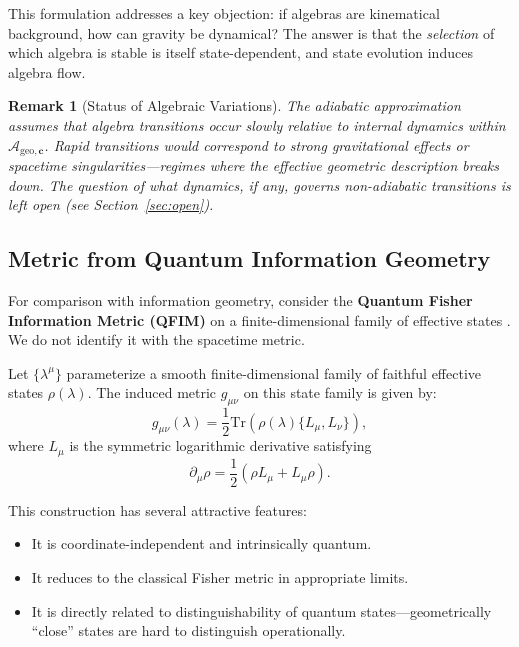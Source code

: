 \documentclass[12pt,a4paper]{article}
\newtheorem{remark}[theorem]{Remark}
\begin{document}
This formulation addresses a key objection: if algebras are kinematical background, how can gravity be dynamical? The answer is that the \emph{selection} of which algebra is stable is itself state-dependent, and state evolution induces algebra flow.

\begin{remark}[Status of Algebraic Variations]
The adiabatic approximation assumes that algebra transitions occur slowly relative to internal dynamics within $\mathcal{A}_{\mathrm{geo},\mathbf{c}}$. Rapid transitions would correspond to strong gravitational effects or spacetime singularities—regimes where the effective geometric description breaks down. The question of what dynamics, if any, governs non-adiabatic transitions is left open (see Section~\ref{sec:open}).
\end{remark}

\subsection{Metric from Quantum Information Geometry}

For comparison with information geometry, consider the \textbf{Quantum Fisher Information Metric (QFIM)} on a finite-dimensional family of effective states \cite{Petz1996,Bengtsson2006}.  We do not identify it with the spacetime metric.

Let $\{\lambda^\mu\}$ parameterize a smooth finite-dimensional family of faithful effective states $\rho(\lambda)$. The induced metric $g_{\mu\nu}$ on this state family is given by:
\begin{equation}
g_{\mu\nu}(\lambda) = \frac{1}{2} \text{Tr}\left( \rho(\lambda) \{ L_\mu, L_\nu \} \right),
\label{eq:qfim-d}
\end{equation}
where $L_\mu$ is the symmetric logarithmic derivative satisfying
\begin{equation}
\partial_\mu \rho = \frac{1}{2}(\rho L_\mu + L_\mu \rho).
\end{equation}

This construction has several attractive features:
\begin{itemize}
    \item It is coordinate-independent and intrinsically quantum.
    \item It reduces to the classical Fisher metric in appropriate limits.
    \item It is directly related to distinguishability of quantum states—geometrically ``close'' states are hard to distinguish operationally.
\end{itemize}
\end{document}

